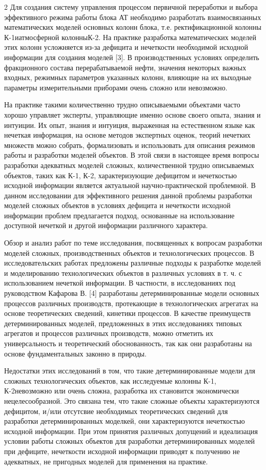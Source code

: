 \begin{multicols}{2}
Для создания систему управления процессом первичной переработки и выбора
эффективного режима работы блока АТ необходимо разработать
взаимосвязанных математических моделей основных колонн блока, т.е.
ректификационной колонны К-1иатмосферной колонныК-2. На практике
разработка математических моделей этих колонн усложняется из-за дефицита
и нечеткости необходимой исходной информации для создания моделей
{[}3{]}. В производственных условиях определить фракционного состава
перерабатываемой нефти, значения некоторых важных входных, режимных
параметров указанных колонн, влияющие на их выходные параметры
измерительными приборами очень сложно или невозможно.

На практике такими количественно трудно описываемыми объектами часто
хорошо управляет эксперты, управляющие именно основе своего опыта,
знания и интуиции. Их опыт, знания и интуиция, выраженная на
естественном языке как нечеткая информация, на основе методов экспертных
оценок, теорий нечетких множеств можно собрать, формализовать и
использовать для описания режимов работы и разработки моделей объектов.
В этой связи в настоящее время вопросы разработки адекватных моделей
сложных, количественной трудно описываемых объектов, таких как К-1, К-2,
характеризующие дефицитом и нечеткостью исходной информации является
актуальной научно-практической проблемной. В данном исследовании для
эффективного решения данной проблемы разработки моделей сложных объектов
в условиях дефицита и нечеткости исходной информации проблем
предлагается подход, основанные на использование доступной нечеткой и
другой информации различного характера.

Обзор и анализ работ по теме исследования, посвященных к вопросам
разработки моделей сложных, производственных объектов и технологических
процессов. В исследовательских работах предложены различные подходы к
разработке моделей и моделированию технологических объектов в различных
условиях в т. ч. с использованием нечеткой информации. В частности, в
исследованиях под руководством Кафарова В. {[}4{]} разработаны
детерминированные модели основных процессов различных производств,
протекающие в технологических агрегатах на основе теоретических
сведений, кинетики процессов. В качестве преимуществ детерминированных
моделей, предложенных в этих исследованиях типовых агрегатов и процессов
различных производств, можно отметить их универсальность и теоретический
обоснованность, так как они разработаны на основе фундаментальных
законно в природы.

Недостатки этих исследований в том, что такие детерминированные модели
для сложных технологических объектов, как исследуемые колонны К-1,
К-2невозможно или очень сложна, разработка их становится экономически
нецелесообразной. Это связана тем, что такие сложные объекты
характеризуются дефицитом, и/или отсутсвие необходимых теоретических
сведений для разработки детерминированных моделкей, они характеризуются
нечеткостью исходной информации. При этом принятия различных допущений и
идеализация условии работы сложных объектов для разработки
детерминированных моделей при дефиците, нечеткости исходной информации
приводят к получению не адекватных, не пригодных моделей для применения
на практике.


\end{multicols}
